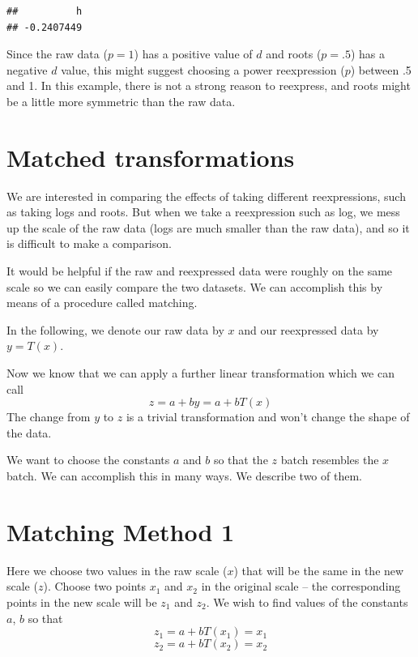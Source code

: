 \documentclass[
]{book}
\begin{document}
\begin{verbatim}
##          h 
## -0.2407449
\end{verbatim}

Since the raw data (\(p = 1\)) has a positive value of \(d\) and roots (\(p = .5\)) has a negative \(d\) value, this might suggest choosing a power reexpression (\(p\)) between .5 and 1. In this example, there is not a strong reason to reexpress, and roots might be a little more symmetric than the raw data.

\hypertarget{matched-transformations}{%
\section{Matched transformations}\label{matched-transformations}}

We are interested in comparing the effects of taking different reexpressions, such as taking logs and roots. But when we take a reexpression such as log, we mess up the scale of the raw data (logs are much smaller than the raw data), and so it is difficult to make a comparison.

It would be helpful if the raw and reexpressed data were roughly on the same scale so we can easily compare the two datasets. We can accomplish this by means of a procedure called matching.

In the following, we denote our raw data by \(x\)
and our reexpressed data by \(y = T(x)\).

Now we know that we can apply a further linear transformation which we can call
\[
z = a + b y = a + b T(x)
\]
The change from \(y\) to \(z\) is a trivial transformation and won't change the shape of the data.

We want to choose the constants \(a\) and \(b\) so that the \(z\) batch resembles the \(x\) batch. We can accomplish this in many ways. We describe two of them.

\hypertarget{matching-method-1}{%
\section{Matching Method 1}\label{matching-method-1}}

Here we choose two values in the raw scale (\(x\)) that will be the same in the new scale (\(z\)). Choose two points \(x_1\) and \(x_2\) in the original scale -- the corresponding points in the new scale will be \(z_1\) and \(z_2\). We wish to find values of the constants \(a\), \(b\) so that
\[
z_1= a + b T(x_1) = x_1
\]
\[
z_2 = a + b T(x_2) = x_2
\]
\end{document}
